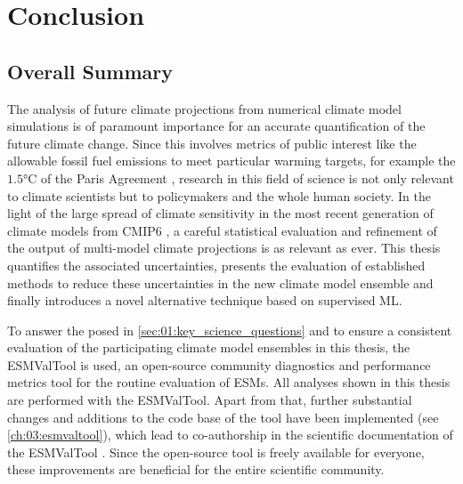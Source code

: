


\chapter{Conclusion}
\label{ch:07:conclusion}


\section{Overall Summary}
\label{sec:07:overall_summary}

The analysis of future climate projections from numerical climate model
simulations is of paramount importance for an accurate quantification of the
future climate change. Since this involves metrics of public interest like the
allowable fossil fuel emissions to meet particular warming targets, for example
the $1.5 \unit{\degreeCelsius}$ of the Paris Agreement \autocite{UNFCCC2015},
research in this field of science is not only relevant to climate scientists
but to policymakers and the whole human society. In the light of the large
spread of climate sensitivity in the most recent generation of climate models
from \acs{CMIP}6 \autocite{Meehl2020}, a careful statistical evaluation and
refinement of the output of multi-model climate projections is as relevant as
ever. This thesis quantifies the associated uncertainties, presents the
evaluation of established methods to reduce these uncertainties in the new
climate model ensemble and finally introduces a novel alternative technique
based on supervised \ac{ML}.

To answer the  posed in
\cref{sec:01:key_science_questions} and to ensure a consistent evaluation of
the participating climate model ensembles in this thesis, the \ac{ESMValTool}
is used, an open-source community diagnostics and performance metrics tool for
the routine evaluation of \acp{ESM}. All analyses shown in this thesis are
performed with the \ac{ESMValTool}. Apart from that, further substantial
changes and additions to the code base of the tool have been implemented (see
\cref{ch:03:esmvaltool}), which lead to co-authorship in the scientific
documentation of the \ac{ESMValTool} \autocite{Eyring2020, Lauer2020,
  Righi2020, Weigel2020}. Since the open-source tool is freely available for
everyone, these improvements are beneficial for the entire scientific
community.

